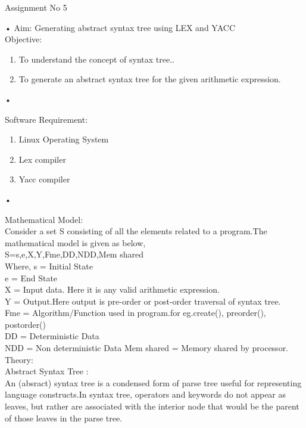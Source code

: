 \documentclass[11pt]{article}
\begin{document}
	
	\begin{center}
		\begin{Large}
			Assignment No 5
		\end{Large}
	\end{center}•
	Aim: Generating abstract syntax tree using LEX and YACC\\
	
	\noindent
	Objective:
	\begin{enumerate}
		\item To understand the concept of syntax tree..
		\item To generate an abstract syntax tree for the given arithmetic expression.
	\end{enumerate}•
	
	\noindent
	Software Requirement:
	\begin{enumerate}
		\item Linux Operating System
		\item Lex compiler
		\item Yacc compiler
	\end{enumerate}•
	
	\noindent
	Mathematical Model:\\
	Consider a set S consisting of all the elements related to a program.The mathematical model is given as below,\\ S={s,e,X,Y,Fme,DD,NDD,Mem shared}\\ Where, s = Initial State\\ e = End State\\
	X	= Input data. Here it is any valid arithmetic expression.\\
	Y	= Output.Here output is pre-order or post-order traversal of syntax tree.\\
	Fme = Algorithm/Function used in program.for eg.{create(), preorder(), postorder()}\\
	DD = Deterministic Data\\
	NDD = Non deterministic Data Mem shared = Memory shared by processor.\\
	
	
	\noindent
	Theory:\\
	Abstract Syntax Tree :\\
	An (absract) syntax tree is a condensed form of parse tree useful for representing language constructs.In syntax tree, operators and keywords do not appear as leaves, but rather are associated with the interior node that would be the parent of those leaves in the parse tree.\\
	
\end{document}
